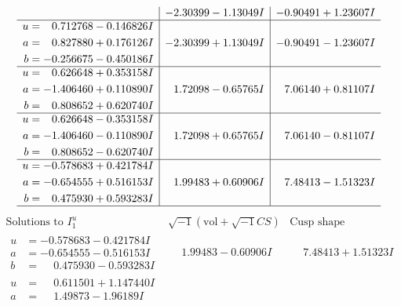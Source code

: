 \documentclass[1p]{elsarticle_modified}
\theoremstyle{definition}
\newcommand{\I}{\sqrt{-1}}
\begin{document}
$$\begin{array}{c|c|c}
 & -2.30399 - 1.13049 I & -0.90491 + 1.23607 I \\ \hline\begin{aligned}
u &= \phantom{-}0.712768 - 0.146826 I \\
a &= \phantom{-}0.827880 + 0.176126 I \\
b &= -0.256675 - 0.450186 I\end{aligned}
 & -2.30399 + 1.13049 I & -0.90491 - 1.23607 I \\ \hline\begin{aligned}
u &= \phantom{-}0.626648 + 0.353158 I \\
a &= -1.406460 + 0.110890 I \\
b &= \phantom{-}0.808652 + 0.620740 I\end{aligned}
 & \phantom{-}1.72098 - 0.65765 I & \phantom{-}7.06140 + 0.81107 I \\ \hline\begin{aligned}
u &= \phantom{-}0.626648 - 0.353158 I \\
a &= -1.406460 - 0.110890 I \\
b &= \phantom{-}0.808652 - 0.620740 I\end{aligned}
 & \phantom{-}1.72098 + 0.65765 I & \phantom{-}7.06140 - 0.81107 I \\ \hline\begin{aligned}
u &= -0.578683 + 0.421784 I \\
a &= -0.654555 + 0.516153 I \\
b &= \phantom{-}0.475930 + 0.593283 I\end{aligned}
 & \phantom{-}1.99483 + 0.60906 I & \phantom{-}7.48413 - 1.51323 I\\
 \hline 
 \end{array}$$\newpage$$\begin{array}{c|c|c}  
\text{Solutions to }I^u_{1}& \I (\text{vol} + \sqrt{-1}CS) & \text{Cusp shape}\\
 \hline 
\begin{aligned}
u &= -0.578683 - 0.421784 I \\
a &= -0.654555 - 0.516153 I \\
b &= \phantom{-}0.475930 - 0.593283 I\end{aligned}
 & \phantom{-}1.99483 - 0.60906 I & \phantom{-}7.48413 + 1.51323 I \\ \hline\begin{aligned}
u &= \phantom{-}0.611501 + 1.147440 I \\
a &= \phantom{-}1.49873 - 1.96189 I \\

\end{aligned}
\end{array}$$
\end{document}
